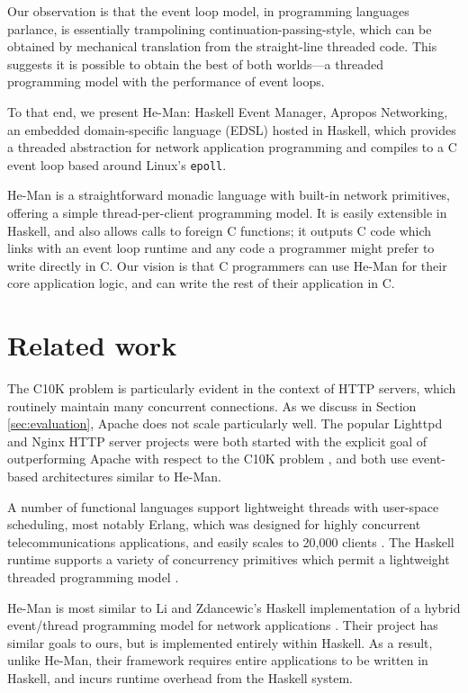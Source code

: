 \documentclass[preprint,11pt]{sigplanconf}
\renewcommand{\t}{\texttt}
\begin{document}
Our observation is that the event loop model, in programming languages parlance,
is essentially trampolining continuation-passing-style, which can be obtained by
mechanical translation from the straight-line threaded code. This suggests it is
possible to obtain the best of both worlds---a threaded programming model with
the performance of event loops. 

To that end, we present He-Man: Haskell Event Manager, Apropos Networking, an
embedded domain-specific language (EDSL) hosted in Haskell, which provides a
threaded abstraction for network application programming and compiles to a C
event loop based around Linux's \t{epoll}.

He-Man is a straightforward monadic language with built-in network primitives,
offering a simple thread-per-client programming model. It is easily extensible
in Haskell, and also allows calls to foreign C functions; it outputs C code
which links with an event loop runtime and any code a programmer might prefer to
write directly in C. Our vision is that C programmers can use He-Man for their
core application logic, and can write the rest of their application in C. 

\section{Related work}

The C10K problem is particularly evident in the context of HTTP servers, which
routinely maintain many concurrent connections. As we discuss in Section
\ref{sec:evaluation}, Apache does not scale particularly well. The popular
Lighttpd and Nginx HTTP server projects were both started with the explicit goal
of outperforming Apache with respect to the C10K problem \cite{Lighttpd,Nginx},
and both use event-based architectures similar to He-Man. 

A number of functional languages support lightweight threads with user-space
scheduling, most notably Erlang, which was designed for highly concurrent
telecommunications applications, and easily scales to 20,000 clients
\cite{Hellstrom}. The Haskell runtime supports a variety of concurrency
primitives which permit a lightweight threaded programming model \cite{LiEtAl}.


He-Man is most similar to Li and Zdancewic's Haskell implementation of a hybrid
event/thread programming model for network applications \cite{LiZdancewic}.
Their project has similar goals to ours, but is implemented entirely within
Haskell. As a result, unlike He-Man, their framework requires entire
applications to be written in Haskell, and incurs runtime overhead from the
Haskell system.
\end{document}
